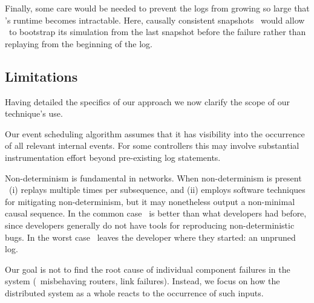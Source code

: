 Finally, some care would be needed to prevent the logs from growing so large that
\simulator's runtime becomes intractable. Here, causally consistent
snapshots~\cite{Chandy:1985:DSD:214451.214456} would allow \projectname~to
bootstrap its simulation from the last snapshot before the failure rather than
replaying from the beginning of the log.

\subsection{Limitations}
\label{subsec:non_goals}

Having detailed the specifics of our approach we now
clarify the scope of our technique's use.

 Our event scheduling algorithm assumes that
it has visibility into the occurrence of all relevant internal events. For
some controllers this may involve substantial instrumentation effort beyond
pre-existing log statements.

 Non-determinism
is fundamental in networks. When non-determinism is present
\projectname~(i) replays multiple times per subsequence, and (ii) employs
software techniques for mitigating non-determinism, but it may nonetheless
output a non-minimal causal sequence. In the common case \projectname~is
better than what developers had before, since developers generally
do not have tools for reproducing non-deterministic bugs.
In the worst case \projectname~leaves the
developer where they started: an unpruned log.



 Our goal is not to find the root
cause of individual component failures in the system (\eg~misbehaving routers,
link failures). Instead, we focus on
how the distributed system as a whole reacts to the occurrence of such inputs.

